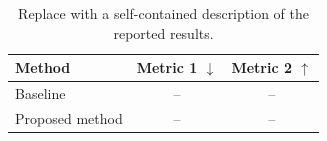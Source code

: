 \begin{table}[t]
  \centering
  \caption{Replace with a self-contained description of the reported results.}
  \label{tab:example_results}
  \begin{tabular}{lcc}
    \toprule
    Method & Metric 1 $\downarrow$ & Metric 2 $\uparrow$ \\
    \midrule
    Baseline & -- & -- \\
    Proposed method & -- & -- \\
    \bottomrule
  \end{tabular}
\end{table}
